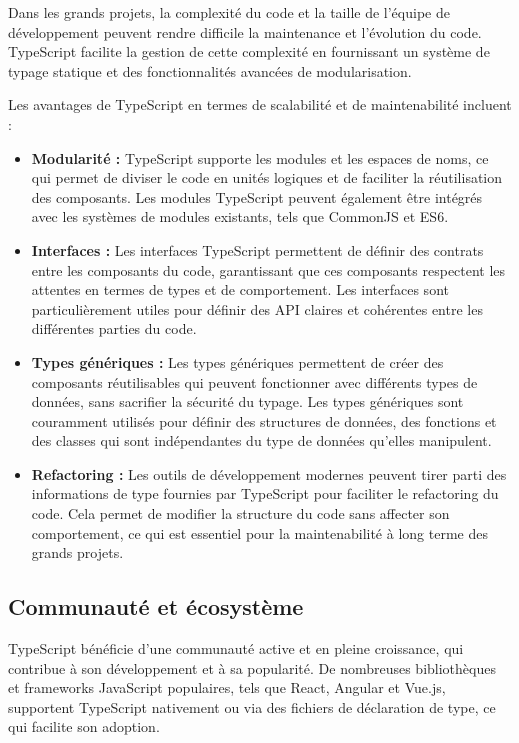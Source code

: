 Dans les grands projets, la complexité du code et la taille de l'équipe de développement peuvent rendre difficile la maintenance et l'évolution du code. TypeScript facilite la gestion de cette complexité en fournissant un système de typage statique et des fonctionnalités avancées de modularisation.

Les avantages de TypeScript en termes de scalabilité et de maintenabilité incluent :

\begin{itemize}
    \item \textbf{Modularité :} TypeScript supporte les modules et les espaces de noms, ce qui permet de diviser le code en unités logiques et de faciliter la réutilisation des composants. Les modules TypeScript peuvent également être intégrés avec les systèmes de modules existants, tels que CommonJS et ES6.
    \item \textbf{Interfaces :} Les interfaces TypeScript permettent de définir des contrats entre les composants du code, garantissant que ces composants respectent les attentes en termes de types et de comportement. Les interfaces sont particulièrement utiles pour définir des API claires et cohérentes entre les différentes parties du code.
    \item \textbf{Types génériques :} Les types génériques permettent de créer des composants réutilisables qui peuvent fonctionner avec différents types de données, sans sacrifier la sécurité du typage. Les types génériques sont couramment utilisés pour définir des structures de données, des fonctions et des classes qui sont indépendantes du type de données qu'elles manipulent.
    \item \textbf{Refactoring :} Les outils de développement modernes peuvent tirer parti des informations de type fournies par TypeScript pour faciliter le refactoring du code. Cela permet de modifier la structure du code sans affecter son comportement, ce qui est essentiel pour la maintenabilité à long terme des grands projets.
\end{itemize}

\subsection{Communauté et écosystème}

TypeScript bénéficie d'une communauté active et en pleine croissance, qui contribue à son développement et à sa popularité. De nombreuses bibliothèques et frameworks JavaScript populaires, tels que React, Angular et Vue.js, supportent TypeScript nativement ou via des fichiers de déclaration de type, ce qui facilite son adoption.

